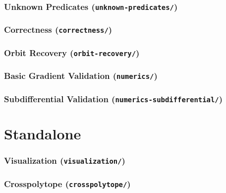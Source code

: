 \documentclass{article}
\begin{document}
\section{Unknown Predicates (\texttt{unknown-predicates/})}
\graphicspath{{dev-numerical-analysis/unknown-predicates/}}


\section{Correctness (\texttt{correctness/})}
\graphicspath{{dev-capacity-validation/correctness/}}


\section{Orbit Recovery (\texttt{orbit-recovery/})}
\graphicspath{{dev-capacity-validation/orbit-recovery/}}


\section{Basic Gradient Validation (\texttt{numerics/})}
\graphicspath{{dev-gradient/numerics/}}


\section{Subdifferential Validation (\texttt{numerics-subdifferential/})}
\graphicspath{{dev-gradient/numerics-subdifferential/}}


\part{Standalone}

\section{Visualization (\texttt{visualization/})}
\graphicspath{{visualization/}}


\section{Crosspolytope (\texttt{crosspolytope/})}
\graphicspath{{crosspolytope/}}

\end{document}
